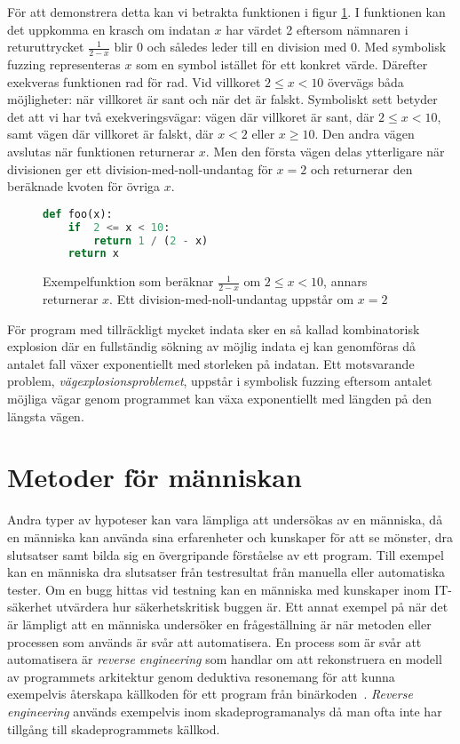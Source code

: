 För att demonstrera detta kan vi betrakta funktionen i figur
\ref{fig:symb_exc_ex_inl}. I funktionen kan det uppkomma en krasch om indatan
$x$ har värdet 2 eftersom nämnaren i returuttrycket $\frac{1}{2 - x}$ blir 0 och
således leder till en division med 0. Med symbolisk fuzzing representeras $x$
som en symbol istället för ett konkret värde. Därefter exekveras funktionen rad
för rad. Vid villkoret $2 \le x < 10$ övervägs båda möjligheter: när villkoret
är sant och när det är falskt. Symboliskt sett betyder det att vi har två
exekveringsvägar: vägen där villkoret är sant, där $2 \le x<10$, samt vägen där
villkoret är falskt, där $x < 2$ eller $x \ge 10$. Den andra vägen avslutas när
funktionen returnerar $x$. Men den första vägen delas ytterligare när
divisionen ger ett division-med-noll-undantag för $x=2$ och returnerar den
beräknade kvoten för övriga $x$.

\begin{figure}[h!]
    \centering
    \begin{lstlisting}[language=Python]
def foo(x):
    if  2 <= x < 10:
        return 1 / (2 - x)
    return x
	\end{lstlisting}
    \caption{
        Exempelfunktion som beräknar $\frac{1}{2 - x}$ om $2 \le x < 10$, annars returnerar $x$.
        Ett division-med-noll-undantag uppstår om $x = 2$}
    \label{fig:symb_exc_ex_inl}
\end{figure}

För program med tillräckligt mycket indata sker en så kallad kombinatorisk
explosion där en fullständig sökning av möjlig indata ej kan genomföras då
antalet fall växer exponentiellt med storleken på indatan. Ett motsvarande
problem, \textit{vägexplosionsproblemet}, uppstår i symbolisk fuzzing eftersom
antalet möjliga vägar genom programmet kan växa exponentiellt med längden på den
längsta vägen.

\section{Metoder för människan}

Andra typer av hypoteser kan vara lämpliga att undersökas av en människa, då en
människa kan använda sina erfarenheter och kunskaper för att se mönster, dra
slutsatser samt bilda sig en övergripande förståelse av ett program. Till
exempel kan en människa dra slutsatser från testresultat från manuella eller
automatiska tester. Om en bugg hittas vid testning kan en människa med
kunskaper inom IT-säkerhet utvärdera hur säkerhetskritisk buggen är. Ett annat
exempel på när det är lämpligt att en människa undersöker en frågeställning är
när metoden eller processen som används är svår att automatisera. En process
som är svår att automatisera är \emph{reverse engineering} som handlar om att
rekonstruera en modell av programmets arkitektur genom deduktiva resonemang för
att kunna exempelvis återskapa källkoden för ett program från
binärkoden~\cite{on_rev_eng}. \emph{Reverse engineering} används exempelvis
inom skadeprogramanalys då man ofta inte har tillgång till skadeprogrammets
källkod.

